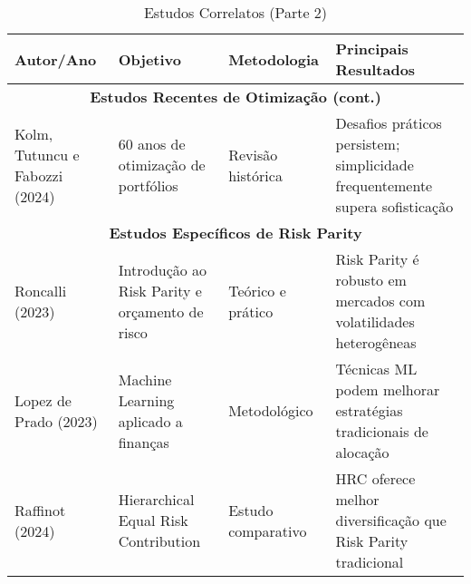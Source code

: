 \begin{table}[H]
\centering
\caption{Estudos Correlatos (Parte 2)}
\begin{tabular}{|p{2.3cm}|p{3.2cm}|p{2.6cm}|p{3.2cm}|}
\hline
\textbf{Autor/Ano} & \textbf{Objetivo} & \textbf{Metodologia} & \textbf{Principais Resultados} \\
\hline
\multicolumn{4}{|c|}{\textbf{Estudos Recentes de Otimização (cont.)}} \\
\hline
Kolm, Tutuncu e Fabozzi (2024) & 60 anos de otimização de portfólios & Revisão histórica & Desafios práticos persistem; simplicidade frequentemente supera sofisticação \\
\hline
\multicolumn{4}{|c|}{\textbf{Estudos Específicos de Risk Parity}} \\
\hline
Roncalli (2023) & Introdução ao Risk Parity e orçamento de risco & Teórico e prático & Risk Parity é robusto em mercados com volatilidades heterogêneas \\
\hline
Lopez de Prado (2023) & Machine Learning aplicado a finanças & Metodológico & Técnicas ML podem melhorar estratégias tradicionais de alocação \\
\hline
Raffinot (2024) & Hierarchical Equal Risk Contribution & Estudo comparativo & HRC oferece melhor diversificação que Risk Parity tradicional \\
\hline
\end{tabular}
\label{tab:estudos_correlatos_2}
\end{table}

